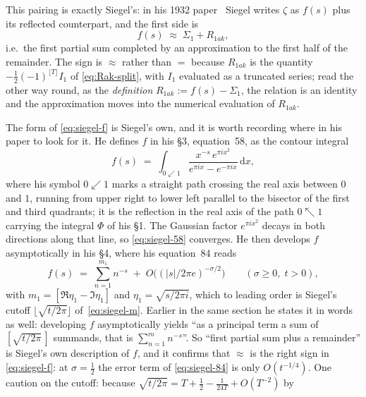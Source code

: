 \documentclass[11pt]{article}
\theoremstyle{definition}
\begin{document}
This pairing is exactly Siegel's: in his 1932 paper~\cite{Siegel1932} Siegel
writes $\zeta$ as
$f(s)$ plus its reflected counterpart, and the first side is
\begin{equation}\label{eq:siegel-f}
f(s) \;\approx\; \Sigma_1 + R_{1ak},
\end{equation}
i.e.\ the first partial sum completed by an approximation to the first half of
the remainder. The sign is $\approx$ rather than $=$ because $R_{1ak}$ is the
quantity $-\tfrac12(-1)^{\lfloor T\rfloor}I_1$ of \eqref{eq:Rak-split}, with
$I_1$ evaluated as a truncated series; read the other way round, as the
\emph{definition} $R_{1ak}:=f(s)-\Sigma_1$, the relation is an identity and the
approximation moves into the numerical evaluation of $R_{1ak}$.

The form of \eqref{eq:siegel-f} is Siegel's own, and it is worth recording where
in his paper to look for it. He defines $f$ in his \S3, equation~58, as the
contour integral
\begin{equation}\label{eq:siegel-58}
f(s)
\;=\;
\int_{0\swarrow 1}
\frac{x^{-s}\,e^{\pi i x^{2}}}{e^{\pi i x}-e^{-\pi i x}}\,\mathrm{d}x ,
\end{equation}
where his symbol $0\swarrow 1$ marks a straight path crossing the real axis
between $0$ and $1$, running from upper right to lower left parallel to the
bisector of the first and third quadrants; it is the reflection in the real axis
of the path $0\nwarrow 1$ carrying the integral $\Phi$ of his \S1. The Gaussian
factor $e^{\pi i x^{2}}$ decays in both directions along that line, so
\eqref{eq:siegel-58} converges. He then develops $f$ asymptotically in his \S4,
where his equation~84 reads
\begin{equation}\label{eq:siegel-84}
f(s)
\;=\;
\sum_{n=1}^{m_{1}} n^{-s}
\;+\;
O\!\bigl((\lvert s\rvert/2\pi e)^{-\sigma/2}\bigr)
\qquad (\sigma\ge 0,\; t>0),
\end{equation}
with $m_{1}=[\Re\eta_{1}-\Im\eta_{1}]$ and $\eta_{1}=\sqrt{s/2\pi i}$, which to
leading order is Siegel's cutoff $\lfloor\sqrt{t/2\pi}\rfloor$
of~\eqref{eq:siegel-m}. Earlier in the same section he states it in words as
well: developing $f$ asymptotically yields ``as a principal term a sum of
$[\sqrt{t/2\pi}\,]$ summands, that is $\sum_{n=1}^{m}n^{-s}$''. So ``first
partial sum plus a remainder'' is Siegel's own description of $f$, and it
confirms that $\approx$ is the right sign in \eqref{eq:siegel-f}: at
$\sigma=\tfrac12$ the error term of \eqref{eq:siegel-84} is only
$O(t^{-1/4})$. One caution on the cutoff: because
$\sqrt{t/2\pi}=T+\tfrac12-\tfrac1{24T}+O(T^{-2})$ by
\end{document}
